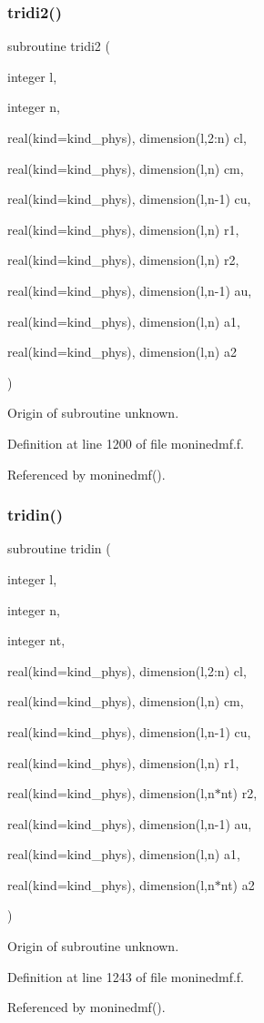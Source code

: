 \subsubsection{\texorpdfstring{tridi2()}{tridi2()}}
{\footnotesize\ttfamily subroutine tridi2 (\begin{DoxyParamCaption}\item[{integer}]{l,  }\item[{integer}]{n,  }\item[{real(kind=kind\+\_\+phys), dimension(l,2\+:n)}]{cl,  }\item[{real(kind=kind\+\_\+phys), dimension(l,n)}]{cm,  }\item[{real(kind=kind\+\_\+phys), dimension(l,n-\/1)}]{cu,  }\item[{real(kind=kind\+\_\+phys), dimension(l,n)}]{r1,  }\item[{real(kind=kind\+\_\+phys), dimension(l,n)}]{r2,  }\item[{real(kind=kind\+\_\+phys), dimension(l,n-\/1)}]{au,  }\item[{real(kind=kind\+\_\+phys), dimension(l,n)}]{a1,  }\item[{real(kind=kind\+\_\+phys), dimension(l,n)}]{a2 }\end{DoxyParamCaption})}

Origin of subroutine unknown. 

Definition at line 1200 of file moninedmf.\+f.



Referenced by moninedmf().

\mbox{\label{group___p_b_l_gab77885fe7ace4ef00558157788778408}} 
\subsubsection{\texorpdfstring{tridin()}{tridin()}}
{\footnotesize\ttfamily subroutine tridin (\begin{DoxyParamCaption}\item[{integer}]{l,  }\item[{integer}]{n,  }\item[{integer}]{nt,  }\item[{real(kind=kind\+\_\+phys), dimension(l,2\+:n)}]{cl,  }\item[{real(kind=kind\+\_\+phys), dimension(l,n)}]{cm,  }\item[{real(kind=kind\+\_\+phys), dimension(l,n-\/1)}]{cu,  }\item[{real(kind=kind\+\_\+phys), dimension(l,n)}]{r1,  }\item[{real(kind=kind\+\_\+phys), dimension(l,n$\ast$nt)}]{r2,  }\item[{real(kind=kind\+\_\+phys), dimension(l,n-\/1)}]{au,  }\item[{real(kind=kind\+\_\+phys), dimension(l,n)}]{a1,  }\item[{real(kind=kind\+\_\+phys), dimension(l,n$\ast$nt)}]{a2 }\end{DoxyParamCaption})}

Origin of subroutine unknown. 

Definition at line 1243 of file moninedmf.\+f.



Referenced by moninedmf().

